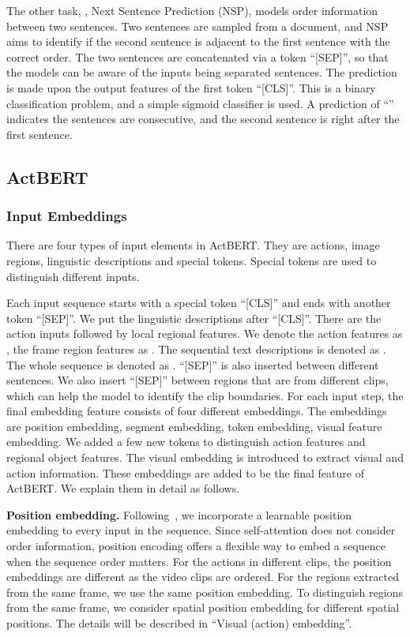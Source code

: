 \documentclass[10pt,twocolumn,letterpaper]{article}
\newcommand{\ours}{ActBERT\xspace}
\begin{document}
The other task, \ie, Next Sentence Prediction (NSP), models order information between two sentences. Two sentences are sampled from a document, and NSP aims to identify if the second sentence is adjacent to the first sentence with the correct order. The two sentences are concatenated via a token ``[SEP]'', so that the models can be aware of the inputs being separated sentences. The prediction is made upon the output features of the first token ``[CLS]''. This is a binary classification problem, and a simple sigmoid classifier is used. A prediction of ``'' indicates the sentences are consecutive, and the second sentence is right after the first sentence.

\subsection{\ours}
\subsubsection{Input Embeddings}
There are four types of input elements in \ours. They are actions, image regions, linguistic descriptions and special tokens. Special tokens are used to distinguish different inputs.

Each input sequence starts with a special token ``[CLS]'' and ends with another token ``[SEP]''. 
We put the linguistic descriptions after ``[CLS]''. There are the action inputs followed by local regional features.
We denote the action features as , the frame region features as . The sequential text descriptions is denoted as .
The whole sequence is denoted as  . ``[SEP]'' is also inserted between different sentences. We also insert ``[SEP]'' between regions that are from different clips, which can help the model to identify the clip boundaries.
For each input step, the final embedding feature consists of four different embeddings.
The embeddings are position embedding, segment embedding, token embedding, visual feature embedding. We added a few new tokens to distinguish action features and regional object features. The visual embedding is introduced to extract visual and action information.
These embeddings are added to be the final feature of \ours. We explain them in detail as follows.

\noindent\textbf{Position embedding.}
Following~\cite{devlin2018bert}, we incorporate a learnable position embedding to every input in the sequence. Since self-attention does not consider order information, position encoding offers a flexible way to embed a sequence when the sequence order matters.
For the actions in different clips, the position embeddings are different as the video clips are ordered. For the regions extracted from the same frame, we use the same position embedding.
To distinguish regions from the same frame, we consider spatial position embedding for different spatial positions. The details will be described in ``Visual (action) embedding''.
\end{document}

